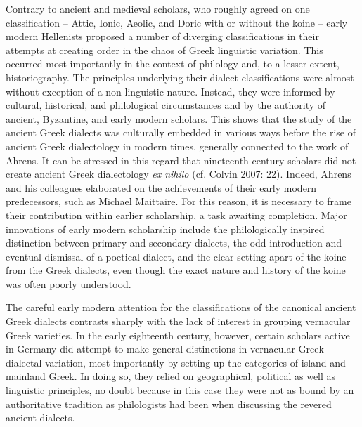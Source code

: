 \documentclass[12pt]{article}
\makeatletter
\renewcommand\subsection{\@startsection{subsection}{2}{0.1972in}{0.1665in}{0.0835in}{\normalfont\normalsize\fontsize{12pt}{14.4pt}\selectfont\rmfamily\bfseries}}
\newenvironment{styleStandard}{\renewcommand\baselinestretch{1.25}\setlength\leftskip{0in}\setlength\rightskip{0in}\setlength\parindent{0.1972in}\setlength\parfillskip{0pt plus 1fil}\setlength\parskip{0in plus 1pt}\writerlistparindent\writerlistleftskip\leavevmode\normalfont\normalsize\writerlistlabel\ignorespaces}{\unskip\vspace{0in plus 1pt}\par}
\newcommand\writerlistleftskip{}
\newcommand\writerlistparindent{}
\newcommand\writerlistlabel{}
\makeatother
\begin{document}
\subsection{Conclusion}
\hypertarget{Toc19704817}{}\begin{styleStandard}
Contrary to ancient and medieval scholars, who roughly agreed on one classification – Attic, Ionic, Aeolic, and Doric with or without the koine – early modern Hellenists proposed a number of diverging classifications in their attempts at creating order in the chaos of Greek linguistic variation. This occurred most importantly in the context of philology and, to a lesser extent, historiography. The principles underlying their dialect classifications were almost without exception of a non-linguistic nature. Instead, they were informed by cultural, historical, and philological circumstances and by the authority of ancient, Byzantine, and early modern scholars. This shows that the study of the ancient Greek dialects was culturally embedded in various ways before the rise of ancient Greek dialectology in modern times, generally connected to the work of Ahrens. It can be stressed in this regard that nineteenth-century scholars did not create ancient Greek dialectology \textit{ex nihilo} (cf. Colvin 2007: 22). Indeed, Ahrens and his colleagues elaborated on the achievements of their early modern predecessors, such as Michael Maittaire. For this reason, it is necessary to frame their contribution within earlier scholarship, a task awaiting completion. Major innovations of early modern scholarship include the philologically inspired distinction between primary and secondary dialects, the odd introduction and eventual dismissal of a poetical dialect, and the clear setting apart of the koine from the Greek dialects, even though the exact nature and history of the koine was often poorly understood.
\end{styleStandard}

\begin{styleStandard}
The careful early modern attention for the classifications of the canonical ancient Greek dialects contrasts sharply with the lack of interest in grouping vernacular Greek varieties. In the early eighteenth century, however, certain scholars active in Germany did attempt to make general distinctions in vernacular Greek dialectal variation, most importantly by setting up the categories of island and mainland Greek. In doing so, they relied on geographical, political as well as linguistic principles, no doubt because in this case they were not as bound by an authoritative tradition as philologists had been when discussing the revered ancient dialects.
\end{styleStandard}
\end{document}
